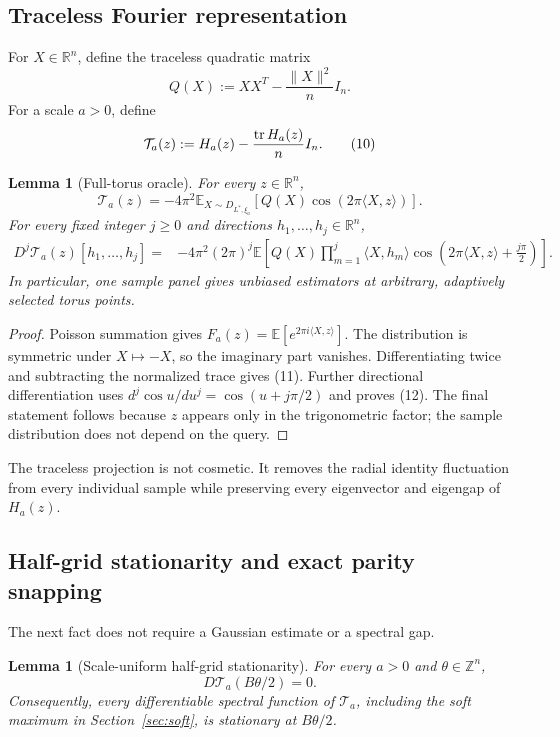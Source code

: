 \documentclass[10pt]{article}
\newtheorem{lemma}[theorem]{Lemma}
\theoremstyle{definition}
\newcommand{\R}{\mathbb{R}}
\newcommand{\Z}{\mathbb{Z}}
\newcommand{\E}{\mathbb{E}}
\newcommand{\tr}{\mathop{\rm tr}}
\newcommand{\ip}[2]{\langle #1,#2\rangle}
\newcommand{\norm}[1]{\lVert #1\rVert}
\newcommand{\cT}{\mathcal{T}}
\begin{document}
\subsection{Traceless Fourier representation}

For $X\in\R^n$, define the traceless quadratic matrix
\[
 Q(X):=XX^T-\frac{\norm X^2}{n}I_n.                                \tag{9}
\]
For a scale $a>0$, define
\[
 \cT_a(z):=H_a(z)-\frac{\tr H_a(z)}{n}I_n.                         \tag{10}
\]

\begin{lemma}[Full-torus oracle]                                  \label{lem:full-torus}
For every $z\in\R^n$,
\[
 \cT_a(z)=-4\pi^2\E_{X\sim D_{L^*,\xi_a}}
       \left[Q(X)\cos(2\pi\ip Xz)\right].                        \tag{11}
\]
For every fixed integer $j\ge0$ and directions
$h_1,\ldots,h_j\in\R^n$,
\begin{align}
 D^j\cT_a(z)[h_1,\ldots,h_j]
 ={}&-4\pi^2(2\pi)^j\E\left[
 Q(X)\prod_{m=1}^j\ip X{h_m}
 \cos\!\left(2\pi\ip Xz+\frac{j\pi}{2}\right)
 \right].                                                        \tag{12}
\end{align}
In particular, one sample panel gives unbiased estimators at arbitrary,
adaptively selected torus points.
\end{lemma}

\begin{proof}
Poisson summation gives
$F_a(z)=\E[e^{2\pi i\ip Xz}]$.  The distribution is symmetric under
$X\mapsto-X$, so the imaginary part vanishes.  Differentiating twice and
subtracting the normalized trace gives (11).  Further directional
differentiation uses
$d^j\cos u/du^j=\cos(u+j\pi/2)$ and proves (12).  The final statement follows
because $z$ appears only in the trigonometric factor; the sample distribution
does not depend on the query.
\end{proof}

The traceless projection is not cosmetic.  It removes the radial identity
fluctuation from every individual sample while preserving every eigenvector
and eigengap of $H_a(z)$.

\subsection{Half-grid stationarity and exact parity snapping}

The next fact does not require a Gaussian estimate or a spectral gap.

\begin{lemma}[Scale-uniform half-grid stationarity]                \label{lem:stationary}
For every $a>0$ and $\theta\in\Z^n$,
\[
 D\cT_a(B\theta/2)=0.                                             \tag{13}
\]
Consequently, every differentiable spectral function of $\cT_a$, including
the soft maximum in Section~\ref{sec:soft}, is stationary at
$B\theta/2$.
\end{lemma}
\end{document}
